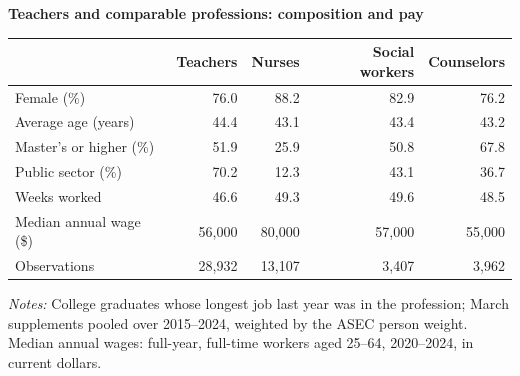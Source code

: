 \documentclass[11pt]{article}
\begin{document}
\begin{center}
{\large\bfseries Teachers and comparable professions: composition and
pay}\\[1.0em]
\begin{threeparttable}
\begin{tabular}{lrrrr}
\toprule
 & Teachers & Nurses & Social workers & Counselors \\
\midrule
Female (\%)              & 76.0   & 88.2   & 82.9  & 76.2  \\
Average age (years)      & 44.4   & 43.1   & 43.4  & 43.2  \\
Master's or higher (\%)  & 51.9   & 25.9   & 50.8  & 67.8  \\
Public sector (\%)       & 70.2   & 12.3   & 43.1  & 36.7  \\
Weeks worked             & 46.6   & 49.3   & 49.6  & 48.5  \\
Median annual wage (\$)  & 56,000 & 80,000 & 57,000 & 55,000 \\
\midrule
Observations             & 28,932 & 13,107 & 3,407 & 3,962 \\
\bottomrule
\end{tabular}
\begin{tablenotes}[flushleft]
\footnotesize
\item \emph{Notes:} College graduates whose longest job last year was
in the profession; March supplements pooled over 2015--2024, weighted
by the ASEC person weight. Median annual wages: full-year, full-time
workers aged 25--64, 2020--2024, in current dollars.
\end{tablenotes}
\end{threeparttable}
\end{center}
\end{document}

